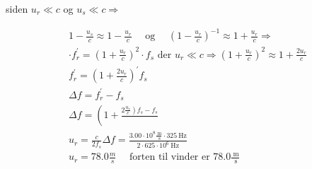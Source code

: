 \documentclass[10pt]{article}
\begin{document}
siden $u_{r} \ll c$ og $u_{s} \ll c \Rightarrow$

$$
\begin{aligned}
& 1-\frac{u_{s}}{c} \approx 1-\frac{u_{r}}{c} \quad \text { og } \quad\left(1-\frac{u_{r}}{c}\right)^{-1} \approx 1+\frac{u_{r}}{c} \Rightarrow \\
& \cdot f_{r}^{\prime}=\left(1+\frac{u_{r}}{c}\right)^{2} \cdot f_{s} \text { der } u_{r} \ll c \Rightarrow\left(1+\frac{u_{r}}{c}\right)^{2} \approx 1+\frac{2 u_{r}}{c} \\
& f_{r}^{\prime}=\left(1+\frac{2 u_{r}}{c}\right)^{\prime} f_{s} \\
& \Delta f=f_{r}^{\prime}-f_{s} \\
& \Delta f=\left(1+\frac{\left.2 \frac{u_{r}}{c}\right) f_{s}-f_{s}}{}\right. \\
& u_{r}=\frac{c}{2 f_{s}} \Delta f=\frac{3.00 \cdot 10^{8} \frac{\mathrm{~m}}{\mathrm{~s}} \cdot 325 \mathrm{~Hz}}{2 \cdot 625 \cdot 10^{6} \mathrm{~Hz}} \\
& u_{r}=78.0 \frac{m}{s} \quad \text { forten til vinder er } 78.0 \frac{\mathrm{~m}}{\mathrm{~s}}
\end{aligned}
$$
\end{document}
